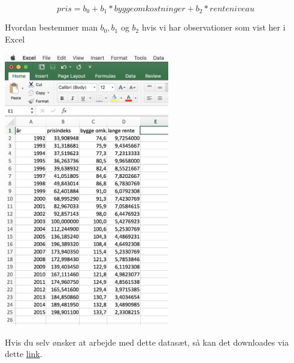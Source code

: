 \begin{displaymath}
  pris = b_0 + b_1 * byggeomkostninger + b_2 * renteniveau
\end{displaymath}

Hvordan bestemmer man \(b_0, b_1\) og \(b_2\) hvis vi har observationer som vist her i Excel
\begin{center}
\includegraphics[height=12cm]{excel1.JPG}
\end{center}
Hvis du selv ønsker at arbejde med dette datasæt, så kan det downloades via dette \href{https://gist.github.com/carsten-j/42595fb16fc646a22bf3f4bec1d81e59/archive/b45e8d1e5e14b83aa16daa652821a8d7b7a3b56d.zip}{link}.

